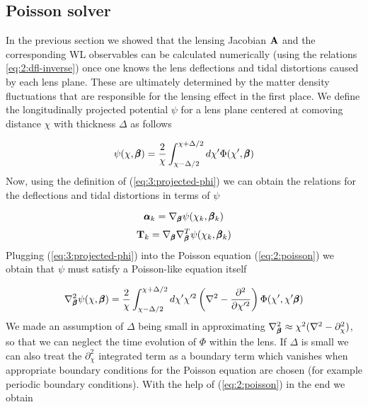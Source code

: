 \subsection{Poisson solver}
In the previous section we showed that the lensing Jacobian $\mathbf{A}$ and the corresponding WL observables can be calculated numerically (using the relations \ref{eq:2:dfl-inverse}) once one knows the lens deflections and tidal distortions caused by each lens plane. These are ultimately determined by the matter density fluctuations that are responsible for the lensing effect in the first place. We define the longitudinally projected potential $\psi$ for a lens plane centered at comoving distance $\chi$ with thickness $\Delta$ as follows

\begin{equation}
\label{eq:3:projected-phi}
\psi(\chi,\pmb{\beta}) = \frac{2}{\chi}\int_{\chi-\Delta/2}^{\chi+\Delta/2}d\chi' \Phi(\chi',\pmb{\beta})
\end{equation} 
%
Now, using the definition of (\ref{eq:3:projected-phi}) we can obtain the relations for the deflections and tidal distortions in terms of $\psi$

\begin{equation}
\label{eq:3:alphak-psi}
\pmb{\alpha}_k = \nabla_{\pmb{\beta}}\psi(\chi_k,\pmb{\beta}_k)
\end{equation}
%
\begin{equation}
\label{eq:3:Tk-psi}
\mathbf{T}_k = \nabla_{\pmb{\beta}}\nabla^T_{\pmb{\beta}}\psi(\chi_k,\pmb{\beta}_k)
\end{equation}
%
Plugging (\ref{eq:3:projected-phi}) into the Poisson equation (\ref{eq:2:poisson}) we obtain that $\psi$ must satisfy a Poisson-like equation itself

\begin{equation}
\label{eq:3:poisson-psi-1}
\nabla^2_{\pmb{\beta}}\psi(\chi,\pmb{\beta}) = \frac{2}{\chi}\int_{\chi-\Delta/2}^{\chi+\Delta/2}d\chi' \chi'^2\left(\nabla^2-\frac{\partial^2}{\partial \chi'^2}\right)\Phi(\chi',\chi'\pmb{\beta})
\end{equation}
%
We made an assumption of $\Delta$ being small in approximating $\nabla^2_{\pmb{\beta}}\approx \chi^2(\nabla^2-\partial_\chi^2)$, so that we can neglect the time evolution of $\Phi$ within the lens. If $\Delta$ is small we can also treat the $\partial^2_\chi$ integrated term as a boundary term which vanishes when appropriate boundary conditions for the Poisson equation are chosen (for example periodic boundary conditions). With the help of (\ref{eq:2:poisson}) in the end we obtain

